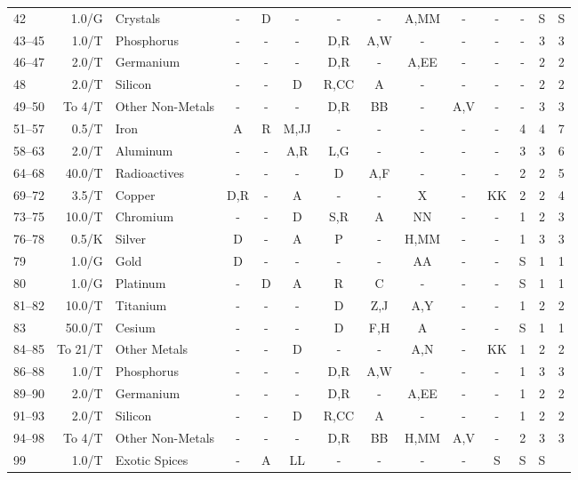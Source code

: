 \begin{table}[htbp]
{\begin{minipage}{0.93\textwidth}
\begin{tabular}{lrlccccccccccc}
42 & 1.0/G & Crystals & - & D & - & - & - & A,MM & - & - & - & S & S\\
\rowcolor{grey}
43--45 & 1.0/T & Phosphorus & - & - & - & D,R & A,W & - & - & - & - & 3 & 3\\
46--47 & 2.0/T & Germanium & - & - & - & D,R & - & A,EE & - & - & - & 2 & 2\\
\rowcolor{grey}
48 & 2.0/T & Silicon & - & - & D & R,CC & A & - & - & - & - & 2 & 2\\
49--50 & To 4/T & Other Non-Metals\footnotemark[2] & - & - & - & D,R & BB & - & A,V & - & - & 3 & 3\\
\rowcolor{grey}
51--57 & 0.5/T & Iron & A & R & M,JJ & - & - & - & - & - & 4 & 4 & 7\\
58--63 & 2.0/T & Aluminum & - & - & A,R & L,G & - & - & - & - & 3 & 3 & 6\\
\rowcolor{grey}
64--68 & 40.0/T & Radioactives & - & - & - & D & A,F & - & - & - & 2 & 2 & 5\\
69--72 & 3.5/T & Copper & D,R & - & A & - & - & X & - & KK & 2 & 2 & 4\\
\rowcolor{grey}
73--75 & 10.0/T & Chromium & - & - & D & S,R & A & NN & - & - & 1 & 2 & 3\\
76--78 & 0.5/K & Silver & D & - & A & P & - & H,MM & - & - & 1 & 3 & 3\\
\rowcolor{grey}
79 & 1.0/G & Gold & D & - & - & - & - & AA & - & - & S & 1 & 1\\
80 & 1.0/G & Platinum & - & D & A & R & C & - & - & - & S & 1 & 1\\
\rowcolor{grey}
81--82 & 10.0/T & Titanium & - & - & - & D & Z,J & A,Y & - & - & 1 & 2 & 2\\
83 & 50.0/T & Cesium & - & - & - & D & F,H & A & - & - & S & 1 & 1\\
\rowcolor{grey}
84--85 & To 21/T & Other Metals\footnotemark[1] & - & - & D & - & - & A,N & - & KK & 1 & 2 & 2\\
86--88 & 1.0/T & Phosphorus & - & - & - & D,R & A,W & - & - & - & 1 & 3 & 3\\
\rowcolor{grey}
89--90 & 2.0/T & Germanium & - & - & - & D,R & - & A,EE & - & - & 1 & 2 & 2\\
91--93 & 2.0/T & Silicon & - & - & D & R,CC & A & - & - & - & 1 & 2 & 2\\
\rowcolor{grey}
94--98 & To 4/T & Other Non-Metals\footnotemark[2] & - & - & - & D,R & BB & H,MM & A,V & - & 2 & 3 & 3\\
99 & 1.0/T & Exotic Spices & - & A & LL & - & - & - & - & S & S & S\\

\end{tabular}
\end{minipage}}
\end{table}
